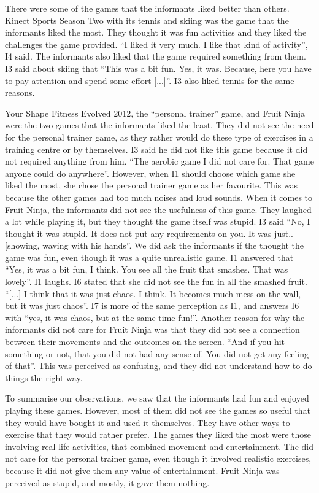 There were some of the games that the informants liked better than others. Kinect Sports Season Two with its tennis and skiing was the game that the informants liked the most. They thought it was fun activities and they liked the challenges the game provided. “I liked it very much. I like that kind of activity”, I4 said. The informants also liked that the game required something from them. I3 said about skiing that “This was a bit fun. Yes, it was. Because, here you have to pay attention and spend some effort [...]”. I3 also liked tennis for the same reasons.  

Your Shape Fitness Evolved 2012, the “personal trainer” game, and Fruit Ninja were the two games that the informants liked the least. They did not see the need for the personal trainer game, as they rather would do these type of exercises in a training centre or by themselves. I3 said he did not like this game because it did not required anything from him. “The aerobic game I did not care for. That game anyone could do anywhere”. However, when I1 should choose which game she liked the most, she chose the personal trainer game as her favourite. This was because the other games had too much noises and loud sounds. When it comes to Fruit Ninja, the informants did not see the usefulness of this game. They laughed a lot while playing it, but they thought the game itself was stupid. I3 said “No, I thought it was stupid. It does not put any requirements on you. It was just.. [showing, waving with his hands”. We did ask the informants if the thought the game was fun, even though it was a quite unrealistic game. I1 answered that “Yes, it was a bit fun, I think. You see all the fruit that smashes. That was lovely”. I1 laughs. I6 stated that she did not see the fun in all the smashed fruit. “[...] I think that it was just chaos. I think. It becomes much mess on the wall, but it was just chaos”. I7 is more of the same perception as I1, and answers I6 with “yes, it was chaos, but at the same time fun!”. Another reason for why the informants did not care for Fruit Ninja was that they did not see a connection between their movements and the outcomes on the screen. “And if you hit something or not, that you did not had any sense of. You did not get any feeling of that”. This was perceived as confusing, and they did not understand how to do things the right way. 

To summarise our observations, we saw that the informants had fun and enjoyed playing these games. However, most of them did not see the games so useful that they would have bought it and used it themselves. They have other ways to exercise that they would rather prefer. The games they liked the most were those involving real-life activities, that combined movement and entertainment. The did not care for the personal trainer game, even though it involved realistic exercises, because it did not give them any value of entertainment. Fruit Ninja was perceived as stupid, and mostly, it gave them nothing.    

